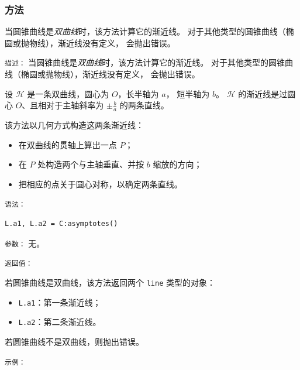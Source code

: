 \subsubsection{方法 }
\label{ssub:conic_asymptotes}

当圆锥曲线是\emph{双曲线}时，该方法计算它的渐近线。
对于其他类型的圆锥曲线（椭圆或抛物线），渐近线没有定义，
会抛出错误。

\medskip


\texttt{描述：}
当圆锥曲线是\emph{双曲线}时，该方法计算它的渐近线。
对于其他类型的圆锥曲线（椭圆或抛物线），渐近线没有定义，
会抛出错误。

\medskip

设 $\mathcal{H}$ 是一条双曲线，圆心为 $O$，长半轴为 $a$，
短半轴为 $b$。
$\mathcal{H}$ 的渐近线是过圆心 $O$、且相对于主轴斜率为
$\pm \tfrac{b}{a}$ 的两条直线。

该方法以几何方式构造这两条渐近线：
\begin{itemize}
  \item 在双曲线的贯轴上算出一点 $P$；
  \item 在 $P$ 处构造两个与主轴垂直、并按 $b$ 缩放的方向；
  \item 把相应的点关于圆心对称，以确定两条直线。
\end{itemize}

\medskip


\texttt{语法：}

\begin{verbatim}
L.a1, L.a2 = C:asymptotes()
\end{verbatim}

\medskip


\texttt{参数：}
无。

\medskip


\texttt{返回值：}

若圆锥曲线是双曲线，该方法返回两个
\texttt{line} 类型的对象：

\begin{itemize}
  \item \texttt{L.a1}：第一条渐近线；
  \item \texttt{L.a2}：第二条渐近线。
\end{itemize}

若圆锥曲线不是双曲线，则抛出错误。

\medskip


\texttt{示例：}

